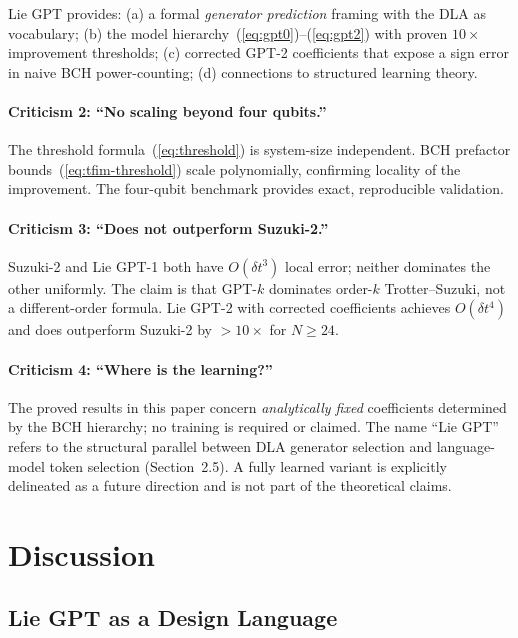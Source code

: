 \documentclass[aps,prxquantum,twocolumn,nofootinbib]{revtex4-2}
\begin{document}
Lie GPT provides: (a) a formal \emph{generator prediction}
framing with the DLA as vocabulary; (b) the model
hierarchy~(\ref{eq:gpt0})--(\ref{eq:gpt2}) with proven
$10\times$ improvement thresholds; (c) corrected GPT-2 coefficients
that expose a sign error in naive BCH power-counting; (d) connections
to structured learning theory.

\paragraph{Criticism 2: ``No scaling beyond four qubits.''}

The threshold formula~(\ref{eq:threshold}) is system-size
independent. BCH prefactor bounds~(\ref{eq:tfim-threshold}) scale
polynomially, confirming locality of the improvement. The four-qubit
benchmark provides exact, reproducible validation.

\paragraph{Criticism 3: ``Does not outperform Suzuki-2.''}

Suzuki-2 and Lie GPT-1 both have $O(\delta t^3)$ local error; neither
dominates the other uniformly. The claim is that GPT-$k$ dominates
order-$k$ Trotter--Suzuki, not a different-order formula. Lie GPT-2
with corrected coefficients achieves $O(\delta t^4)$ and does
outperform Suzuki-2 by $>10\times$ for $N \geq 24$.

\paragraph{Criticism 4: ``Where is the learning?''}

The proved results in this paper concern \emph{analytically fixed}
coefficients determined by the BCH hierarchy; no training is required
or claimed.  The name ``Lie GPT'' refers to the structural parallel
between DLA generator selection and language-model token selection
(Section~2.5).  A fully learned variant is explicitly delineated
as a future direction and is not part of the theoretical claims.

\section{Discussion}
\label{sec:discussion}

\subsection{Lie GPT as a Design Language}
\end{document}
